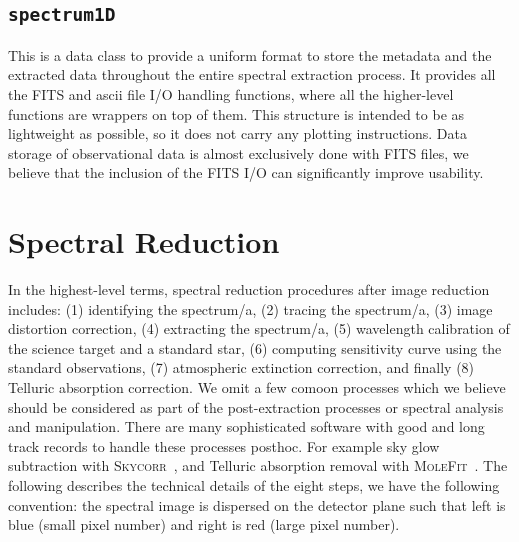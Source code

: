 \documentclass[fleqn,usenatbib]{mnras}
\begin{document}
\subsection{\texttt{spectrum1D}}
This is a data class to provide a uniform format to store the metadata
and the extracted data throughout the entire spectral extraction process.
It provides all the FITS and ascii file I/O handling functions, where all
the higher-level functions are wrappers on top of them. This structure is
intended to be as lightweight as possible, so it does not carry any plotting
instructions. Data storage of observational data is almost exclusively done
with FITS files, we believe that the inclusion of the
FITS I/O can significantly improve usability.

\section{Spectral Reduction}
In the highest-level terms, spectral reduction procedures after image
reduction includes: (1) identifying the spectrum/a, (2) tracing the
spectrum/a, (3) image distortion correction, (4) extracting the
spectrum/a, (5) wavelength calibration of the science target and a
standard star, (6) computing sensitivity curve using the standard
observations, (7) atmospheric extinction correction,
and finally (8) Telluric absorption correction. We omit a few comoon
processes which we believe should be considered as part of the
post-extraction processes or spectral analysis and manipulation.
There are many sophisticated software with good and long track records
to handle these processes posthoc. For example sky glow subtraction
with \textsc{Skycorr}~\citep{2014A&A...567A..25N}, and Telluric
absorption removal with
\textsc{MoleFit}~\citep{2015A&A...576A..77S, 2015A&A...576A..78K}.
The following describes the technical details of the eight steps,
we have the following convention: the spectral image is dispersed
on the detector plane such that left is blue (small pixel number)
and right is red (large pixel number).
\end{document}
